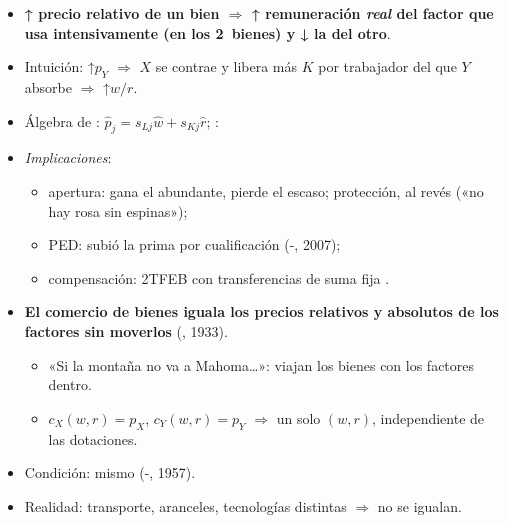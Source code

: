 \documentclass{article}
\begin{document}
\begin{columnas}
\begin{itemize}
\item \textbf{↑ precio relativo de un bien $\Rightarrow$ ↑ remuneración \emph{real} del factor que usa intensivamente (en los 2~bienes) y ↓ la del otro}.
\item Intuición: ↑$p_Y$ $\Rightarrow$ $X$ se contrae y libera más $K$ por trabajador del que $Y$ absorbe $\Rightarrow$ ↑$w/r$.
\item Álgebra de : $\hat p_j=s_{Lj}\hat w+s_{Kj}\hat r$; :
\item \emph{Implicaciones}:
  \begin{itemize}
  \item apertura: gana el abundante, pierde el escaso; protección, al revés («no hay rosa sin espinas»);
  \item PED: subió la prima por cualificación (-, 2007);
  \item compensación: 2TFEB con transferencias de suma fija .
  \end{itemize}
\end{itemize}
\begin{itemize}
\item \textbf{El comercio de bienes iguala los precios relativos y absolutos de los factores sin moverlos} (, 1933).
  \begin{itemize}
  \item «Si la montaña no va a Mahoma\ldots»: viajan los bienes con los factores dentro.
  \item $c_X(w,r)=p_X$, $c_Y(w,r)=p_Y$ $\Rightarrow$ un solo $(w,r)$, independiente de las dotaciones.
  \end{itemize}
\item Condición: mismo  (-, 1957).
\item Realidad: transporte, aranceles, tecnologías distintas $\Rightarrow$ no se igualan.
\end{itemize}

\end{columnas}
\end{document}

